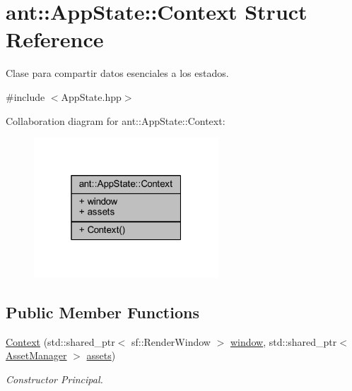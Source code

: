 \hypertarget{structant_1_1_app_state_1_1_context}{\section{ant\+:\+:App\+State\+:\+:Context Struct Reference}
\label{structant_1_1_app_state_1_1_context}
}


Clase para compartir datos esenciales a los estados.  




{\ttfamily \#include $<$App\+State.\+hpp$>$}



Collaboration diagram for ant\+:\+:App\+State\+:\+:Context\+:
\nopagebreak
\begin{figure}[H]
\begin{center}
\leavevmode
\includegraphics[width=196pt]{df/d41/structant_1_1_app_state_1_1_context__coll__graph}
\end{center}
\end{figure}
\subsection*{Public Member Functions}
\begin{DoxyCompactItemize}
\item 
\hyperlink{structant_1_1_app_state_1_1_context_ae475b9ad746d6b59e0b3e4e1170922e6}{Context} (std\+::shared\+\_\+ptr$<$ sf\+::\+Render\+Window $>$ \hyperlink{structant_1_1_app_state_1_1_context_ae91cf7291fa22557f71702ce1e5f2eb2}{window}, std\+::shared\+\_\+ptr$<$ \hyperlink{classant_1_1_asset_manager}{Asset\+Manager} $>$ \hyperlink{structant_1_1_app_state_1_1_context_af678ddb7f0a97211689fc31ba94c881f}{assets})
\begin{DoxyCompactList}\small\item\em Constructor Principal. \end{DoxyCompactList}\end{DoxyCompactItemize}
